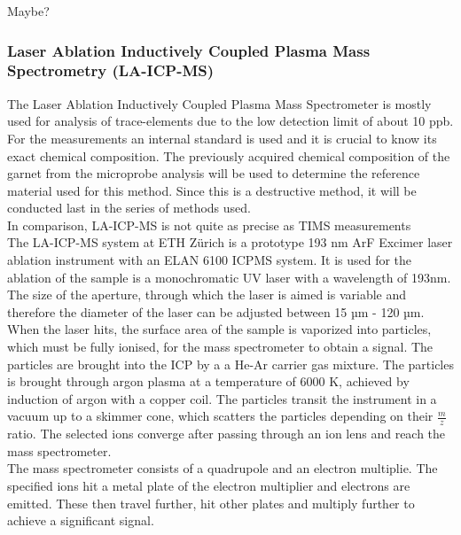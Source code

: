 \documentclass[a4paper,11pt,titlepage]{article}
\begin{document}
Maybe?

\subsubsection{Laser Ablation Inductively Coupled Plasma Mass Spectrometry (LA-ICP-MS)}

The Laser Ablation Inductively Coupled Plasma Mass Spectrometer is mostly used for analysis of trace-elements due to the low detection limit of about 10 ppb. For the measurements an internal standard is used and it is crucial to know its exact chemical composition. The previously acquired chemical composition of the garnet from the microprobe analysis will be used to determine the reference material used for this method. Since this is a destructive method, it will be conducted last in the series of methods used. 
\\
\noindent In comparison, LA-ICP-MS is not quite as precise as TIMS measurements
\\
\noindent The LA-ICP-MS system at ETH Zürich is a prototype 193 nm ArF Excimer laser ablation instrument with an ELAN 6100 ICPMS system. It is used for the ablation of the sample is a monochromatic UV laser with a wavelength of 193nm. The size of the aperture, through which the laser is aimed is variable and therefore the diameter of the laser can be adjusted between 15 µm - 120 µm.
\\
\noindent When the laser hits, the surface area of the sample is vaporized into particles, which must be fully ionised, for the mass spectrometer to obtain a signal. The particles are brought into the ICP by a a He-Ar carrier gas mixture. The particles is brought through argon plasma at a temperature of 6000 K, achieved by induction of argon with a copper coil. The particles transit the instrument in a vacuum up to a skimmer cone, which scatters the particles depending on their \( \frac{m}{z} \) ratio. The selected ions converge after passing through an ion lens and reach the mass spectrometer.
\\
\noindent The mass spectrometer consists of a quadrupole and an electron multiplie. The specified ions hit a metal plate of the electron multiplier and electrons are emitted. These then travel further, hit other plates and multiply further to achieve a significant signal.



\end{document}
